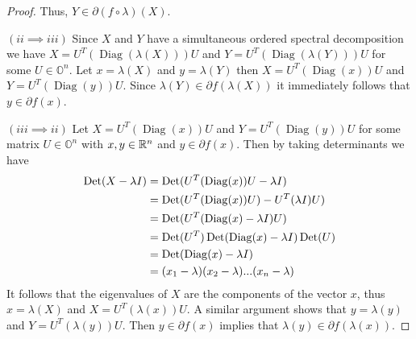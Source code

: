 \begin{proof}
Thus, $Y \in \partial (f \circ \lambda)(X)$.

\item $(ii \implies iii)$ Since $X$ and $Y$ have a simultaneous ordered spectral decomposition we have $X = U^T(\operatorname{Diag}(\lambda(X)))U$ and $Y = U^T(\operatorname{Diag}(\lambda(Y)))U$ for some $U \in \mathbb{O}^n$. Let $x = \lambda(X)$ and $y = \lambda(Y)$ then $X = U^T(\operatorname{Diag}(x))U$ and $Y = U^T(\operatorname{Diag}(y))U$. Since $\lambda(Y) \in \partial f(\lambda(X))$ it immediately follows that $y \in \partial f(x)$.

\item $(iii \implies ii)$ Let $X = U^T (\operatorname{Diag}(x))U$ and $Y = U^T (\operatorname{Diag}(y))U$ for some matrix $U \in \mathbb{O}^n$ with $x, y \in \Bbb R^n$ and $y \in \partial f(x)$. Then by taking determinants we have
\begin{align*}
\operatorname{Det} (X - \lambda I) &= \operatorname{Det} (U^T (\operatorname{Diag}(x))U - \lambda I)\\
&= \operatorname{Det}(U^T (\operatorname{Diag}(x)) U) - U^T(\lambda I)U)\\
&= \operatorname{Det}(U^T (\operatorname{Diag}(x) - \lambda I)U)\\
&= \operatorname{Det}(U^T) \operatorname{Det}(\operatorname{Diag}(x) - \lambda I) \operatorname{Det}(U) \\
&= \operatorname{Det}(\operatorname{Diag}(x) - \lambda I)\\
&= (x_1 - \lambda)(x_2 - \lambda)...(x_n - \lambda)
\end{align*}
It follows that the eigenvalues of $X$ are the components of the vector $x$, thus $x = \lambda(X)$ and $X = U^T (\lambda(x))U$. A similar argument shows that $y = \lambda(y)$ and $Y = U^T (\lambda(y)) U$. Then $y \in \partial f(x)$ implies that $\lambda(y) \in \partial f(\lambda(x))$.
\end{proof}
